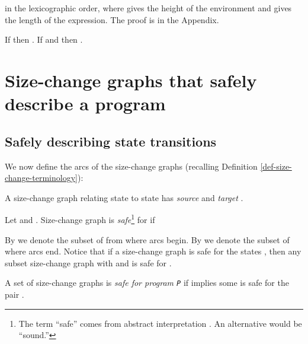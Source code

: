 \documentclass{LMCS}
\newcommand{\fl}{\noindent}
\newcommand{\bdfn}{\begin{defi}}
\newcommand{\edfn}{\end{defi}}
\newcommand{\blem}{\begin{lem}}
\newcommand{\elem}{\end{lem}}
\theoremstyle{definition}\newtheorem{env}[thm]{Environment}
\begin{document}
in the lexicographic order, where  gives the height of the environment and  gives the length of the expression. 
 The proof is in the Appendix.



\blem\label{lem-sub-env}
If  then . 
If  and  then .
\elem


\section{Size-change graphs that safely describe a program}


\subsection{Safely describing state transitions}

We now define the arcs of the size-change graphs 
(recalling Definition \ref{def-size-change-terminology}):
\bdfn 
\label{def-graph-arcs}
A size-change graph  relating state  to state  has {\em source}
 and {\em target}
. 
\edfn


\bdfn\label{def-safe-call-and-evaluation}
Let
 and .
Size-change graph  is 
{\em safe}\footnote{The term ``safe'' comes from abstract interpretation 
\cite{jonesnielson}. An alternative would be  ``sound.''}  
for  if

\edfn
\fl
By  we denote the subset of  from where arcs begin. By  we denote the subset of  where arcs end.
Notice that if a size-change graph  is safe for the states , then any subset size-change graph  with  and  is safe for .


\bdfn
\label{safe-set-of-size-change-graphs}
A set  of size-change graphs is 
{\em safe for program {\tt P}} if  
 implies some 
 is safe 
for the pair .
\edfn
\end{document}
